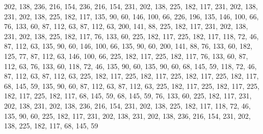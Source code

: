 202, 138, 236, 216, 154, 236, 216, 154, 231, 202, 138, 225, 182, 117, 231, 202,
138, 231, 202, 138, 225, 182, 117, 135, 90, 60, 146, 100, 66, 226, 196, 135,
146, 100, 66, 76, 133, 60, 87, 112, 63, 87, 112, 63, 200, 141, 88, 225,
182, 117, 231, 202, 138, 231, 202, 138, 225, 182, 117, 76, 133, 60, 225, 182,
117, 225, 182, 117, 118, 72, 46, 87, 112, 63, 135, 90, 60, 146, 100, 66,
135, 90, 60, 200, 141, 88, 76, 133, 60, 182, 125, 77, 87, 112, 63, 146,
100, 66, 225, 182, 117, 225, 182, 117, 76, 133, 60, 87, 112, 63, 76, 133,
60, 118, 72, 46, 135, 90, 60, 135, 90, 60, 68, 145, 59, 118, 72, 46,
87, 112, 63, 87, 112, 63, 225, 182, 117, 225, 182, 117, 225, 182, 117, 225,
182, 117, 68, 145, 59, 135, 90, 60, 87, 112, 63, 87, 112, 63, 225, 182,
117, 225, 182, 117, 225, 182, 117, 225, 182, 117, 68, 145, 59, 68, 145, 59,
76, 133, 60, 225, 182, 117, 231, 202, 138, 231, 202, 138, 236, 216, 154, 231,
202, 138, 225, 182, 117, 118, 72, 46, 135, 90, 60, 225, 182, 117, 231, 202,
138, 231, 202, 138, 236, 216, 154, 231, 202, 138, 225, 182, 117, 68, 145, 59
